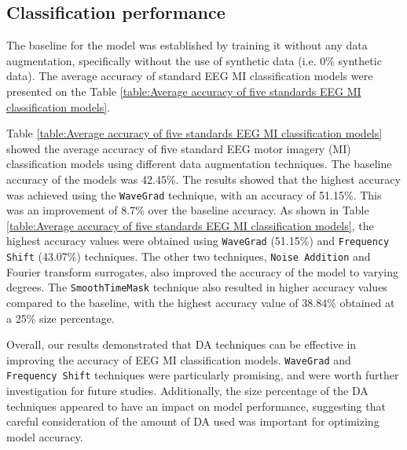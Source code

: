 \documentclass[runningheads]{llncs}
\begin{document}
\subsection{Classification performance}
The baseline for the model was established by training it without any data augmentation, specifically without the use of synthetic data (i.e. 0\% synthetic data). The average accuracy of standard EEG MI classification models were presented on the Table \ref{table:Average accuracy of five standards EEG MI classification models}. 

Table \ref{table:Average accuracy of five standards EEG MI classification models} showed the average accuracy of five standard EEG motor imagery (MI) classification models using different data augmentation techniques. The baseline accuracy of the models was 42.45\%.  The results showed that the highest accuracy was achieved using the \texttt{WaveGrad} technique, with an accuracy of 51.15\%. This was an improvement of 8.7\% over the baseline accuracy. As shown in Table \ref{table:Average accuracy of five standards EEG MI classification models}, the highest accuracy values were obtained using \texttt{WaveGrad} (51.15\%) and \texttt{Frequency Shift} (43.07\%) techniques. The other two techniques, \texttt{Noise Addition} and Fourier transform surrogates, also improved the accuracy of the model to varying degrees. The \texttt{\texttt{SmoothTimeMask}} technique also resulted in higher accuracy values compared to the baseline, with the highest accuracy value of 38.84\% obtained at a 25\% size percentage.


Overall, our results demonstrated that DA techniques can be effective in improving the accuracy of EEG MI classification models. \texttt{WaveGrad} and \texttt{Frequency Shift} techniques were particularly promising, and were worth further investigation for future studies. Additionally, the size percentage of the DA techniques appeared to have an impact on model performance, suggesting that careful consideration of the amount of DA used was important for optimizing model accuracy. 
\end{document}
